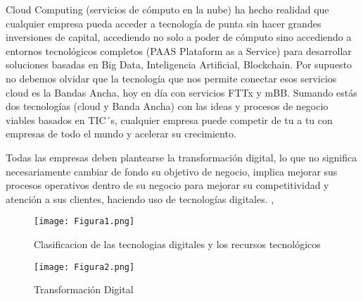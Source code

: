 \documentclass[12pt]{article}
\begin{document}
Cloud Computing (servicios de cómputo en la nube) ha hecho realidad que cualquier empresa pueda acceder a tecnología de punta sin hacer grandes inversiones de capital, accediendo no solo a poder de cómputo sino accediendo a entornos tecnológicos completos (PAAS Plataform as a Service) para desarrollar soluciones basadas en Big Data, Inteligencia Artificial, Blockchain. Por supuesto no debemos olvidar que la tecnología que nos permite conectar esos servicios cloud es la Bandas Ancha, hoy en día con servicios FTTx y mBB. Sumando estás dos tecnologías (cloud y Banda Ancha) con las ideas y procesos de negocio viables basados en TIC´s, cualquier empresa puede competir de tu a tu con empresas de todo el mundo y acelerar su crecimiento.

Todas las empresas deben plantearse la transformación digital, lo que no significa necesariamente cambiar de fondo su objetivo de negocio, implica mejorar sus procesos operativos dentro de su negocio para mejorar su competitividad y atención a sus clientes, haciendo uso de tecnologías digitales.
\cite{UNAMRevista}, \cite{AmericaEconomia}
\begin{figure}[h]
    \centering
    \texttt{[image: Figura1.png]}
    \caption{Clasificacion de las tecnologias digitales y los recursos tecnológicos}
    \label{fig:imagen1}
\end{figure}

\begin{figure}[h]
    \centering
    \texttt{[image: Figura2.png]}
    \caption{Transformación Digital}
    \label{fig:imagen2}
\end{figure}
\end{document}
